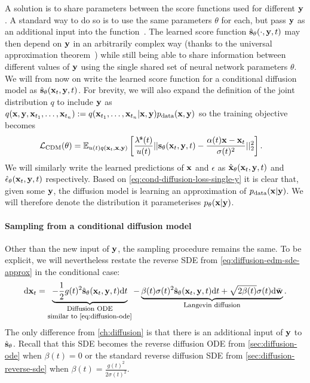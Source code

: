 A solution is to share parameters between the score functions used for different ${\mathbf{y}}$. A standard way to do so is to use the same parameters $\theta$ for each, but pass ${\mathbf{y}}$ as an additional input into the function~\citep{sohn2015learning}. The learned score function $\hat{{\mathbf{s}}}_\theta(\cdot, {\mathbf{y}}, t)$ may then depend on ${\mathbf{y}}$ in an arbitrarily complex way (thanks to the universal approximation theorem~\citep{hornik1989multilayer}) while still being able to share information between different values of ${\mathbf{y}}$ using the single shared set of neural network parameters $\theta$. We will from now on write the learned score function for a conditional diffusion model as $\hat{{\mathbf{s}}}_\theta({\mathbf{x}}_t, {\mathbf{y}}, t)$. For brevity, we will also expand the definition of the joint distribution $q$ to include ${\mathbf{y}}$ as $q({\mathbf{x}},{\mathbf{y}},{\mathbf{x}}_{t_1},\ldots,{\mathbf{x}}_{t_n}) := q({\mathbf{x}}_{t_1},\ldots,{\mathbf{x}}_{t_n}|{\mathbf{x}},{\mathbf{y}})p_{\rm{data}}({\mathbf{x}},{\mathbf{y}})$ so the training objective becomes
\begin{align} \label{eq:cond-diffusion-loss}
    {\mathcal{L}}_\text{CDM}(\theta) &= \mathbb{E}_{u(t)q({\mathbf{x}}_t, {\mathbf{x}}, {\mathbf{y}})} \left[ \frac{\lambda^{\mathbf{s}}(t)}{u(t)} 
    || {\mathbf{s}}_{\theta}({\mathbf{x}}_t, {\mathbf{y}}, t) - \frac{\alpha(t){\mathbf{x}}-{\mathbf{x}}_t}{\sigma(t)^2} ||_2^2 \right].
\end{align}
We will similarly write the learned predictions of ${\mathbf{x}}$ and $\epsilon$ as $\hat{{\mathbf{x}}}_{\theta}({\mathbf{x}}_t, {\mathbf{y}}, t)$ and $\hat{\mathbf{\epsilon}}_{\theta}({\mathbf{x}}_t, {\mathbf{y}}, t)$ respectively.
Based on \cref{eq:cond-diffusion-loss-single-y} it is clear that, given some ${\mathbf{y}}$, the diffusion model is learning an approximation of $p_{\rm{data}}({\mathbf{x}}|{\mathbf{y}})$. We will therefore denote the distribution it parameterises $p_\theta({\mathbf{x}}|{\mathbf{y}})$.

\paragraph{Sampling from a conditional diffusion model}
Other than the new input of ${\mathbf{y}}$, the sampling procedure remains the same. To be explicit, we will nevertheless restate the reverse SDE from \cref{eq:diffusion-edm-sde-approx} in the conditional case:
\begin{align}
    \mathrm{d}\rvx_t = \underbrace{- \frac{1}{2} g(t)^2 \preds_\theta(\rvx_t, \rvy, t) \mathrm{d}t}_{\shortstack{\footnotesize Diffusion ODE \\ \footnotesize similar to \cref{eq:diffusion-ode}}} - \underbrace{\beta(t) \sigma(t)^2 \preds_\theta(\rvx_t, \rvy, t) \mathrm{d}t + \sqrt{2\beta(t)}\sigma(t)\mathrm{d}\bar{\rvw}}_\text{\footnotesize Langevin diffusion}.
\end{align}
The only difference from \cref{ch:diffusion} is that there is an additional input of ${\mathbf{y}}$ to $\hat{{\mathbf{s}}}_\theta$. Recall that this SDE becomes the reverse diffusion ODE from \cref{sec:diffusion-ode} when $\beta(t) = 0$ or the standard reverse diffusion SDE from \cref{sec:diffusion-reverse-sde} when $\beta(t) = \frac{g(t)^2}{2 \sigma(t)^2}$.

